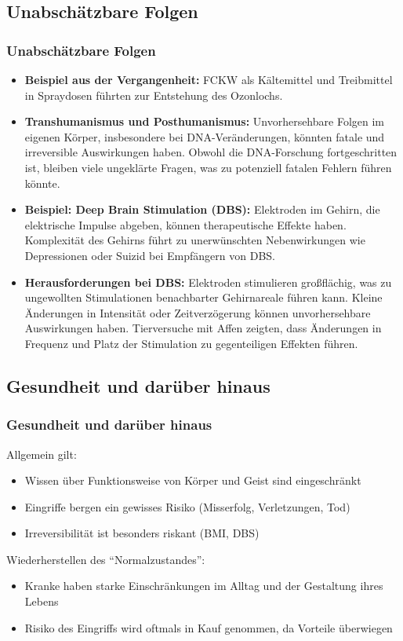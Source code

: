 \documentclass[aspectratio=169,16pt,xcolor=table]{beamer}
\begin{document}
\subsection*{Unabschätzbare Folgen}
\begin{frame}
  \frametitle{Unabschätzbare Folgen}
  \begin{itemize}
    \item \textbf{Beispiel aus der Vergangenheit:} FCKW als Kältemittel und Treibmittel in Spraydosen führten zur Entstehung des Ozonlochs\cite{rowland1996stratospheric}.
    \item \textbf{Transhumanismus und Posthumanismus:} Unvorhersehbare Folgen im eigenen Körper, insbesondere bei DNA-Veränderungen, könnten fatale und irreversible Auswirkungen haben. Obwohl die DNA-Forschung fortgeschritten ist, bleiben viele ungeklärte Fragen, was zu potenziell fatalen Fehlern führen könnte.
    \item \textbf{Beispiel: Deep Brain Stimulation (DBS):} Elektroden im Gehirn, die elektrische Impulse abgeben, können therapeutische Effekte haben. Komplexität des Gehirns führt zu unerwünschten Nebenwirkungen wie Depressionen oder Suizid bei Empfängern von DBS\cite{zarzycki2020stimulation}.
    \item \textbf{Herausforderungen bei DBS:} Elektroden stimulieren großflächig, was zu ungewollten Stimulationen benachbarter Gehirnareale führen kann. Kleine Änderungen in Intensität oder Zeitverzögerung können unvorhersehbare Auswirkungen haben\cite{al2021impact}. Tierversuche mit Affen zeigten, dass Änderungen in Frequenz und Platz der Stimulation zu gegenteiligen Effekten führen\cite{logothetis2010effects}.
  \end{itemize}
\end{frame}

\subsection*{Gesundheit und darüber hinaus}
\begin{frame}
  \frametitle{Gesundheit und darüber hinaus}
  Allgemein gilt:
  \begin{itemize}
      \item Wissen über Funktionsweise von Körper und Geist sind eingeschränkt
      \item Eingriffe bergen ein gewisses Risiko (Misserfolg, Verletzungen, Tod)
      \item Irreversibilität ist besonders riskant (BMI, DBS)
  \end{itemize}
  Wiederherstellen des ``Normalzustandes'':
  \begin{itemize}
      \item Kranke haben starke Einschränkungen im Alltag und der Gestaltung ihres Lebens
      \item Risiko des Eingriffs wird oftmals in Kauf genommen, da Vorteile überwiegen
  \end{itemize}
\end{frame}
\end{document}
